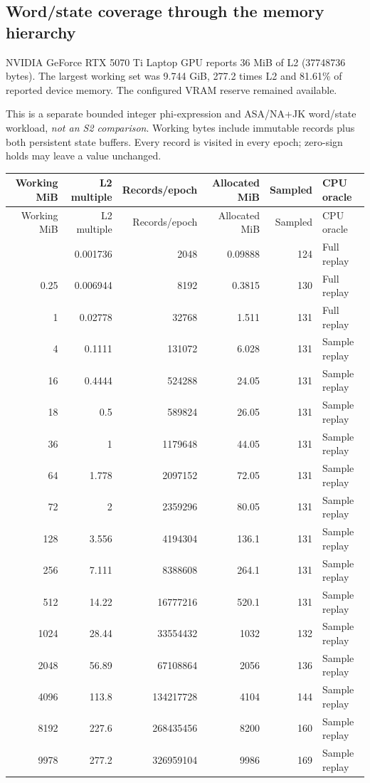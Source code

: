 \subsection{Word/state coverage through the memory hierarchy}

NVIDIA GeForce RTX 5070 Ti Laptop GPU reports 36 MiB of L2 (37748736 bytes). The largest working set was 9.744 GiB, 277.2 times L2 and 81.61\% of reported device memory. The configured VRAM reserve remained available.

This is a separate bounded integer phi-expression and ASA/NA+JK word/state workload, \emph{not an S2 comparison}. Working bytes include immutable records plus both persistent state buffers. Every record is visited in every epoch; zero-sign holds may leave a value unchanged.

\begingroup
\scriptsize
\setlength{\tabcolsep}{2.5pt}
\renewcommand{\arraystretch}{1.16}
\begin{longtable}{rrrrrl}
\toprule
Working MiB & L2 multiple & Records/epoch & Allocated MiB & Sampled & CPU oracle \\
\midrule\endfirsthead
\toprule
Working MiB & L2 multiple & Records/epoch & Allocated MiB & Sampled & CPU oracle \\
\midrule\endhead
\bottomrule\endfoot
0.0625 & 0.001736 & 2048 & 0.09888 & 124 & Full replay \\
0.25 & 0.006944 & 8192 & 0.3815 & 130 & Full replay \\
1 & 0.02778 & 32768 & 1.511 & 131 & Full replay \\
4 & 0.1111 & 131072 & 6.028 & 131 & Sample replay \\
16 & 0.4444 & 524288 & 24.05 & 131 & Sample replay \\
18 & 0.5 & 589824 & 26.05 & 131 & Sample replay \\
36 & 1 & 1179648 & 44.05 & 131 & Sample replay \\
64 & 1.778 & 2097152 & 72.05 & 131 & Sample replay \\
72 & 2 & 2359296 & 80.05 & 131 & Sample replay \\
128 & 3.556 & 4194304 & 136.1 & 131 & Sample replay \\
256 & 7.111 & 8388608 & 264.1 & 131 & Sample replay \\
512 & 14.22 & 16777216 & 520.1 & 131 & Sample replay \\
1024 & 28.44 & 33554432 & 1032 & 132 & Sample replay \\
2048 & 56.89 & 67108864 & 2056 & 136 & Sample replay \\
4096 & 113.8 & 134217728 & 4104 & 144 & Sample replay \\
8192 & 227.6 & 268435456 & 8200 & 160 & Sample replay \\
9978 & 277.2 & 326959104 & 9986 & 169 & Sample replay \\
\end{longtable}
\endgroup

